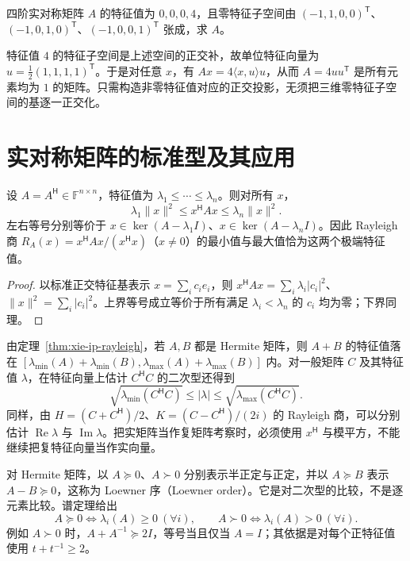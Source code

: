 \begin{example}
四阶实对称矩阵 $A$ 的特征值为 $0,0,0,4$，且零特征子空间由 $(-1,1,0,0)^{\mathsf T}$、$(-1,0,1,0)^{\mathsf T}$、$(-1,0,0,1)^{\mathsf T}$ 张成，求 $A$。
\end{example}
\begin{solve}
特征值 $4$ 的特征子空间是上述空间的正交补，故单位特征向量为 $u=\tfrac12(1,1,1,1)^{\mathsf T}$。于是对任意 $x$，有 $Ax=4\langle x,u\rangle u$，从而 $A=4uu^{\mathsf T}$ 是所有元素均为 $1$ 的矩阵。只需构造非零特征值对应的正交投影，无须把三维零特征子空间的基逐一正交化。
\end{solve}

\section{实对称矩阵的标准型及其应用}
\label{sec:xie-ip-symmetric}

\begin{theorem}
\label{thm:xie-ip-rayleigh}
设 $A=A^{\mathsf H}\in\mathbb F^{n\times n}$，特征值为 $\lambda_1\leq\cdots\leq\lambda_n$。则对所有 $x$，
\[
\lambda_1\|x\|^2\leq x^{\mathsf H}Ax\leq\lambda_n\|x\|^2.
\]
左右等号分别等价于 $x\in\ker(A-\lambda_1I)$、$x\in\ker(A-\lambda_nI)$。因此 Rayleigh 商 $R_A(x)=x^{\mathsf H}Ax/(x^{\mathsf H}x)$（$x\ne0$）的最小值与最大值恰为这两个极端特征值。
\end{theorem}
\begin{proof}
以标准正交特征基表示 $x=\sum_i c_ie_i$，则 $x^{\mathsf H}Ax=\sum_i\lambda_i|c_i|^2$、$\|x\|^2=\sum_i|c_i|^2$。上界等号成立等价于所有满足 $\lambda_i<\lambda_n$ 的 $c_i$ 均为零；下界同理。
\end{proof}

由定理~\ref{thm:xie-ip-rayleigh}，若 $A,B$ 都是 Hermite 矩阵，则 $A+B$ 的特征值落在 $[\lambda_{\min}(A)+\lambda_{\min}(B),\lambda_{\max}(A)+\lambda_{\max}(B)]$ 内。对一般矩阵 $C$ 及其特征值 $\lambda$，在特征向量上估计 $C^{\mathsf H}C$ 的二次型还得到
\begin{equation}
\label{eq:xie-ip-eigen-singular-bound}
\sqrt{\lambda_{\min}(C^{\mathsf H}C)}\leq|\lambda|
\leq\sqrt{\lambda_{\max}(C^{\mathsf H}C)}.
\end{equation}
同样，由 $H=(C+C^{\mathsf H})/2$、$K=(C-C^{\mathsf H})/(2i)$ 的 Rayleigh 商，可以分别估计 $\operatorname{Re}\lambda$ 与 $\operatorname{Im}\lambda$。把实矩阵当作复矩阵考察时，必须使用 $x^{\mathsf H}$ 与模平方，不能继续把复特征向量当作实向量。

对 Hermite 矩阵，以 $A\succeq0$、$A\succ0$ 分别表示半正定与正定，并以 $A\succeq B$ 表示 $A-B\succeq0$，这称为 Loewner 序（Loewner order）。它是对二次型的比较，不是逐元素比较。谱定理给出
\[
A\succeq0\Longleftrightarrow\lambda_i(A)\geq0\ (\forall i),
\qquad A\succ0\Longleftrightarrow\lambda_i(A)>0\ (\forall i).
\]
例如 $A\succ0$ 时，$A+A^{-1}\succeq2I$，等号当且仅当 $A=I$；其依据是对每个正特征值使用 $t+t^{-1}\geq2$。

